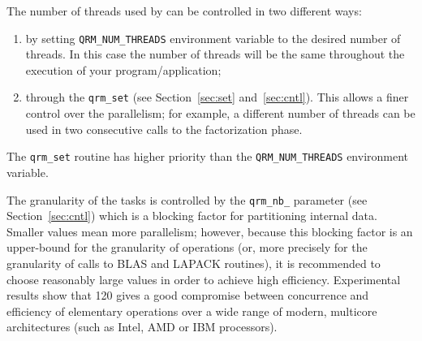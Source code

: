 \documentclass[11pt]{article}
\begin{document}
The number of threads used by \qrm can be controlled in two different
ways:
\begin{enumerate}
\item by setting \texttt{QRM\_NUM\_THREADS} environment variable to the desired
  number of threads. In this case the number of threads will be the
  same throughout the execution of your program/application;
\item through the \texttt{qrm\_set} (see Section~\ref{sec:set}
  and~\ref{sec:cntl}). This allows a finer control over the
  parallelism; for example, a different number of threads can be used
  in two consecutive calls to the factorization phase.
\end{enumerate}

The \texttt{qrm\_set} routine has higher priority than the
\texttt{QRM\_NUM\_THREADS} environment variable. 

The granularity of the tasks is controlled by the \texttt{qrm\_nb\_}
parameter (see Section~\ref{sec:cntl}) which is a blocking factor for
partitioning internal data. Smaller values mean more parallelism;
however, because this blocking factor is an upper-bound for the
granularity of operations (or, more precisely for the granularity of
calls to BLAS and LAPACK routines), it is recommended to choose
reasonably large values in order to achieve high efficiency. 
Experimental results show that 120 gives a good compromise between
concurrence and efficiency of elementary operations over a wide range of
modern, multicore architectures (such as Intel, AMD or IBM processors).
\end{document}
